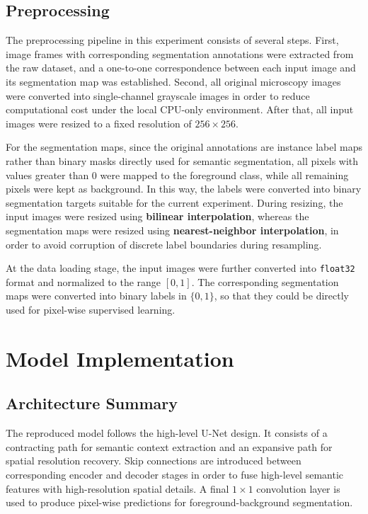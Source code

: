 \documentclass[11pt]{article}
\begin{document}
\subsection{Preprocessing}

The preprocessing pipeline in this experiment consists of several steps. First, image frames with corresponding segmentation annotations were extracted from the raw dataset, and a one-to-one correspondence between each input image and its segmentation map was established. Second, all original microscopy images were converted into single-channel grayscale images in order to reduce computational cost under the local CPU-only environment. After that, all input images were resized to a fixed resolution of \(256 \times 256\).

For the segmentation maps, since the original annotations are instance label maps rather than binary masks directly used for semantic segmentation, all pixels with values greater than 0 were mapped to the foreground class, while all remaining pixels were kept as background. In this way, the labels were converted into binary segmentation targets suitable for the current experiment. During resizing, the input images were resized using \textbf{bilinear interpolation}, whereas the segmentation maps were resized using \textbf{nearest-neighbor interpolation}, in order to avoid corruption of discrete label boundaries during resampling.

At the data loading stage, the input images were further converted into \texttt{float32} format and normalized to the range \([0,1]\). The corresponding segmentation maps were converted into binary labels in \(\{0,1\}\), so that they could be directly used for pixel-wise supervised learning.

\section{Model Implementation}

\subsection{Architecture Summary}

The reproduced model follows the high-level U-Net design. It consists of a contracting path for semantic context extraction and an expansive path for spatial resolution recovery. Skip connections are introduced between corresponding encoder and decoder stages in order to fuse high-level semantic features with high-resolution spatial details. A final \(1 \times 1\) convolution layer is used to produce pixel-wise predictions for foreground-background segmentation.
\end{document}
